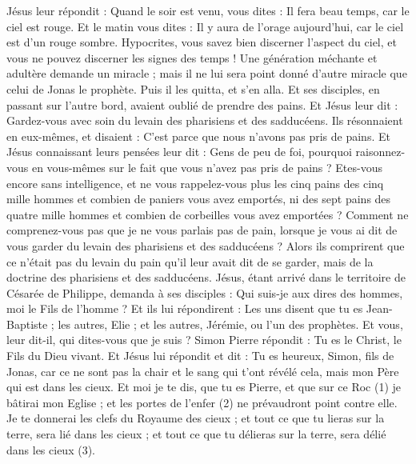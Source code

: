 \begin{multicols}{2}
{Jésus leur répondit : Quand le soir est venu, vous dites : Il fera beau temps, car le ciel est rouge.
Et le matin vous dites : Il y aura de l'orage aujourd'hui, car le ciel est d’un rouge sombre. Hypocrites, vous savez bien discerner l’aspect du ciel, et vous ne pouvez discerner les signes des temps !
Une génération méchante et adultère demande un miracle ; mais il ne lui sera point donné d'autre miracle que celui de Jonas le prophète. Puis il les quitta, et s'en alla.
Et ses disciples, en passant sur l’autre bord, avaient oublié de prendre des pains.
Et Jésus leur dit : Gardez-vous avec soin du levain des pharisiens et des sadducéens.
Ils résonnaient en eux-mêmes, et disaient : C’est parce que nous n'avons pas pris de pains.
Et Jésus connaissant leurs pensées leur dit : Gens de peu de foi, pourquoi raisonnez-vous en vous-mêmes sur le fait que vous n'avez pas pris de pains ?
Etes-vous encore sans intelligence, et ne vous rappelez-vous plus les cinq pains des cinq mille hommes et combien de paniers vous avez emportés,
ni des sept pains des quatre mille hommes et combien de corbeilles vous avez emportées ?
Comment ne comprenez-vous pas que je ne vous parlais pas de pain, lorsque je vous ai dit de vous garder du levain des pharisiens et des sadducéens ?
Alors ils comprirent que ce n'était pas du levain du pain qu'il leur avait dit de se garder, mais de la doctrine des pharisiens et des sadducéens.
Jésus, étant arrivé dans le territoire de Césarée de Philippe, demanda à ses disciples : Qui suis-je aux dires des hommes, moi le Fils de l'homme ?
Et ils lui répondirent : Les uns disent que tu es Jean-Baptiste ; les autres, Elie ; et les autres, Jérémie, ou l'un des prophètes.
Et vous, leur dit-il, qui dites-vous que je suis ?
Simon Pierre répondit : Tu es le Christ, le Fils du Dieu vivant.
Et Jésus lui répondit et dit : Tu es heureux, Simon, fils de Jonas, car ce ne sont pas la chair et le sang qui t’ont révélé cela, mais mon Père qui est dans les cieux.
Et moi je te dis, que tu es Pierre, et que sur ce Roc (1) je bâtirai mon Eglise ; et les portes de l’enfer (2) ne prévaudront point contre elle.
Je te donnerai les clefs du Royaume des cieux ; et tout ce que tu lieras sur la terre, sera lié dans les cieux ; et tout ce que tu délieras sur la terre, sera délié dans les cieux (3).
}
\end{multicols}

